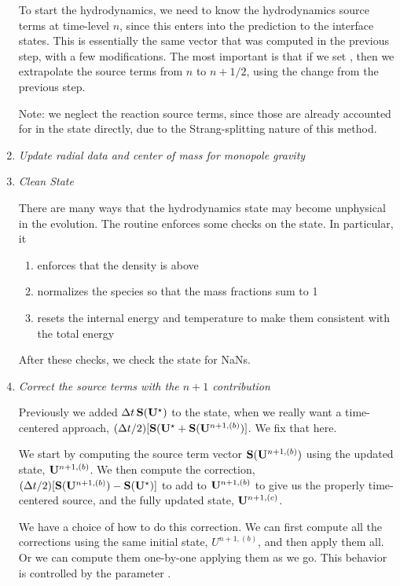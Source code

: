 \begin{enumerate}
  To start the hydrodynamics, we need to know the hydrodynamics source
  terms at time-level $n$, since this enters into the prediction to
  the interface states.  This is essentially the same vector that was
  computed in the previous step, with a few modifications.  The most
  important is that if we set
  , then we extrapolate the
  source terms from $n$ to $n+1/2$, using the change from the previous
  step.

  Note: we neglect the reaction source terms, since those are already
  accounted for in the state directly, due to the Strang-splitting
  nature of this method.


\item {\em Update radial data and center of mass for monopole gravity}


\item {\em Clean State}

  There are many ways that the hydrodynamics state may become
  unphysical in the evolution.  The  routine
  enforces some checks on the state.  In particular, it
  \begin{enumerate}
  \item enforces that the density is above 
  \item normalizes the species so that the mass fractions sum to 1
  \item resets the internal energy and temperature to 
    make them consistent with the total energy
  \end{enumerate}

  After these checks, we check the state for NaNs.


\item {\em Correct the source terms with the $n+1$ contribution}

  Previously we added $\Delta t\, {\bf S}({\bf U}^\star)$ to the state, when
  we really want a time-centered approach, $(\Delta t/2)[{\bf S}({\bf U}^\star
    + {\bf S}({\bf U}^{n+1,(b)})]$.  We fix that here.

  We start by computing the source term vector ${\bf S}({\bf U}^{n+1,(b)})$
  using the updated state, ${\bf U}^{n+1,(b)}$.  We then compute the
  correction, $(\Delta t/2)[{\bf S}({\bf U}^{n+1,(b)}) - {\bf S}({\bf U}^\star)]$ to
  add to ${\bf U}^{n+1,(b)}$ to give us the properly time-centered source,
  and the fully updated state, ${\bf U}^{n+1,(c)}$.

  We have a choice of how to do this correction.  We can first compute
  all the corrections using the same initial state, $U^{n+1,(b)}$,
  and then apply them all.  Or we can compute them one-by-one applying
  them as we go.  This behavior is controlled by the parameter
  .


\end{enumerate}
